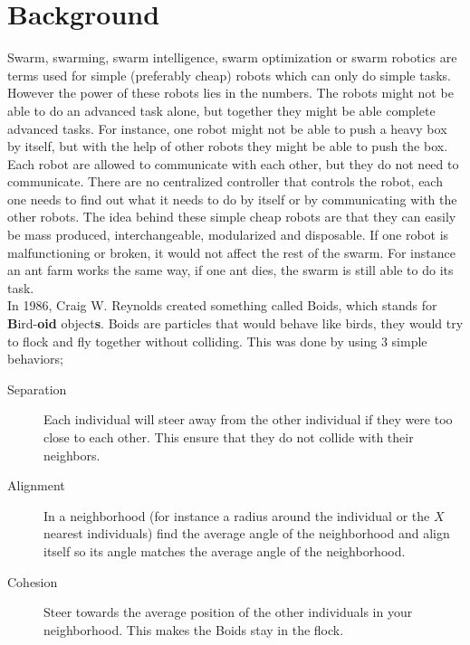 \section{Background}
Swarm, swarming, swarm intelligence, swarm optimization or swarm robotics are terms used for simple (preferably cheap) robots which can only do simple tasks. However the power of these robots lies in the numbers. The robots might not be able to do an advanced task alone, but together they might be able complete advanced tasks. For instance, one robot might not be able to push a heavy box by itself, but with the help of other robots they might be able to push the box.
Each robot are allowed to communicate with each other, but they do not need to communicate. There are no centralized controller that controls the robot, each one needs to find out what it needs to do by itself or by communicating with the other robots. The idea behind these simple cheap robots are that they can easily be mass produced, interchangeable, modularized and disposable. If one robot is malfunctioning or broken, it would not affect the rest of the swarm. For instance an ant farm works the same way, if one ant dies, the swarm is still able to do its task.\\


In 1986, Craig W. Reynolds created something called Boids, which stands for \textbf{B}ird-\textbf{oid} object\textbf{s}. Boids are particles that would behave like birds, they would try to flock and fly together without colliding. This was done by using 3 simple behaviors;
\begin{description}
    \item[Separation]
        Each individual will steer away from the other individual if they were too close to each other. This ensure that they do not collide with their neighbors.
    \item[Alignment]
        In a neighborhood (for instance a radius around the individual or the $X$ nearest individuals) find the average angle of the neighborhood and align itself so its angle matches the average angle of the neighborhood.
    \item[Cohesion]
        Steer towards the average position of the other individuals in your neighborhood. This makes the Boids stay in the flock.
\end{description}

